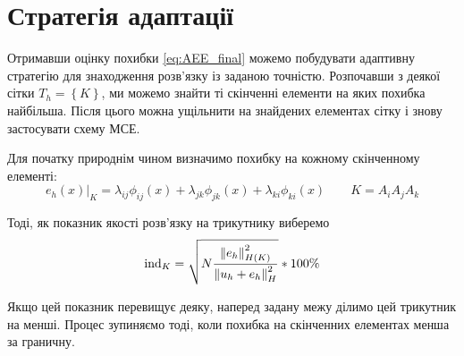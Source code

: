 
\section{Стратегія адаптації}

Отримавши оцінку похибки \eqref{eq:AEE_final} можемо побудувати адаптивну стратегію для знаходження розв'язку із заданою точністю.
Розпочавши з деякої сітки $T_h =  \left\{ K \right\}$, ми можемо знайти ті скінченні елементи на яких похибка найбільша.
Після цього можна ущільнити на знайдених елементах сітку і знову застосувати схему МСЕ.

Для початку природнім чином визначимо похибку на кожному скінченному елементі:
%
\newcommand{\error}[1]{\lambda_{#1} \phi_{#1}(x)}
\begin{equation}\label{eq:error_element}
	e_h(x)|_K = \error{ij}+\error{jk}+\error{ki} \qquad K = A_iA_jA_k
\end{equation}

Тоді, як показник якості розв'язку на трикутнику виберемо
%
\begin{equation}\label{eq:error_indicator}
	\text{ind}_K = \sqrt{N \frac
			{\left\lVert e_h\right\rVert^2_{H(K)}}
			{\left\lVert u_h+e_h\right\rVert^2_H}
	}*100\%
\end{equation}

Якщо цей показник перевищує деяку, наперед задану межу ділимо цей трикутник на менші.
Процес зупиняємо тоді, коли похибка на скінченних елементах менша за граничну.

\undef{\error}
